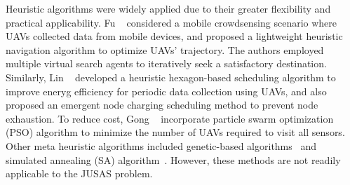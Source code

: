\begin{metaresponse}
\begin{changes}
		Heuristic algorithms were widely applied due to their greater flexibility and practical applicability.
		Fu \etal~\cite{a-heuristic1} considered a mobile crowdsensing scenario where UAVs collected data from mobile devices, and proposed a lightweight heuristic navigation algorithm to optimize UAVs' trajectory.
		The authors employed multiple virtual search agents to iteratively seek a satisfactory destination.
		Similarly, Lin \etal~\cite{a-heuristic3} developed a heuristic hexagon-based scheduling algorithm to improve eneryg efficiency for periodic data collection using UAVs,
		and also proposed an emergent node charging scheduling method to prevent node exhaustion.
		To reduce cost, Gong \etal~\cite{a-heuristic2} incorporate particle swarm optimization (PSO) algorithm to minimize the number of UAVs required to visit all sensors.
		Other meta heuristic algorithms included genetic-based algorithms~\cite{a-heuristic4} and simulated annealing (SA) algorithm~\cite{liao2024energy}.
		However, these methods are not readily applicable to the JUSAS problem.
	\end{changes}
\end{metaresponse}

